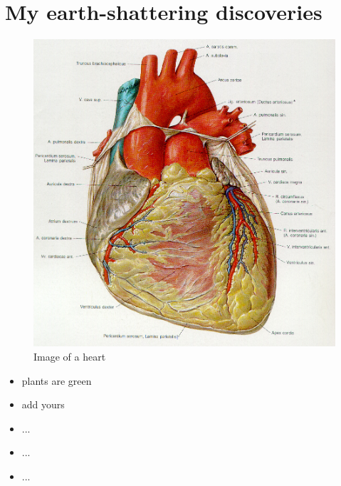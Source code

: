 \documentclass{article}
\begin{document}
\section{My earth-shattering discoveries}

\begin{figure}
  \centering
  \includegraphics[width=.6\textwidth]{figure1.jpg}
  \caption{Image of a heart}
\end{figure}


\begin{itemize}
 \item plants are green 
 \item add yours
 \item ...
 \item ...
 \item ...
\end{itemize}
 
\end{document}
